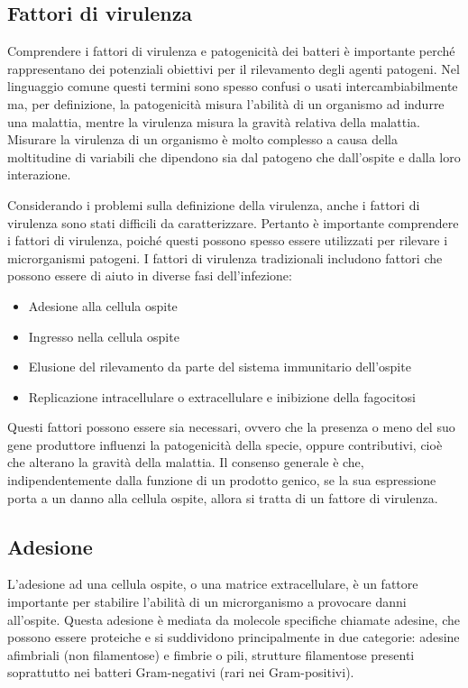 \documentclass[../main.tex]{subfiles}
\begin{document}
\subsection{Fattori di virulenza}

Comprendere i fattori di virulenza e patogenicità dei batteri è importante perché rappresentano dei potenziali obiettivi per il rilevamento degli agenti patogeni. Nel linguaggio comune questi termini sono spesso confusi o usati intercambiabilmente ma, per definizione, la patogenicità misura l'abilità di un organismo ad indurre una malattia, mentre la virulenza misura la gravità relativa della malattia.\cite{watson_1949} Misurare la virulenza di un organismo è molto complesso a causa della moltitudine di variabili che dipendono sia dal patogeno che dall'ospite e dalla loro interazione.\cite{casadevall_2001}

Considerando i problemi sulla definizione della virulenza, anche i fattori di virulenza sono stati difficili da caratterizzare. Pertanto è importante comprendere i fattori di virulenza, poiché questi possono spesso essere utilizzati per rilevare i microrganismi patogeni. I fattori di virulenza tradizionali includono fattori che possono essere di aiuto in diverse fasi dell'infezione: \cite{love_2008}

\begin{itemize}
	\itemsep0em 
	\item Adesione alla cellula ospite
	\item Ingresso nella cellula ospite
	\item Elusione del rilevamento da parte del sistema immunitario dell'ospite
	\item Replicazione intracellulare o extracellulare e inibizione della fagocitosi
\end{itemize}

Questi fattori possono essere sia necessari, ovvero che la presenza o meno del suo gene produttore influenzi la patogenicità della specie, oppure contributivi, cioè che alterano la gravità della malattia. Il consenso generale è che, indipendentemente dalla funzione di un prodotto genico, se la sua espressione porta a un danno alla cellula ospite, allora si tratta di un fattore di virulenza.\cite{casadevall_1999}

\subsection{Adesione}

L'adesione ad una cellula ospite, o una matrice extracellulare, è un fattore importante per stabilire l'abilità di un microrganismo a provocare danni all'ospite. Questa adesione è mediata da molecole specifiche chiamate adesine, che possono essere proteiche e si suddividono principalmente in due categorie: adesine afimbriali (non filamentose) e fimbrie o pili, strutture filamentose presenti soprattutto nei batteri Gram-negativi (rari nei Gram-positivi).
\end{document}
